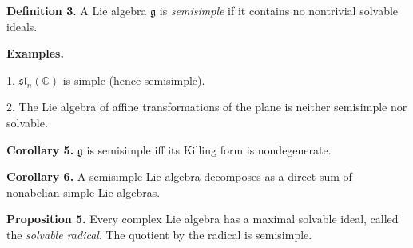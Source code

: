 \textbf{Definition 3.}
A Lie algebra $\mathfrak g$ is \emph{semisimple}
if it contains no nontrivial solvable ideals.

\textbf{Examples.}

1. $\mathfrak{sl}_n(\mathbb C)$ is simple (hence semisimple).

2. The Lie algebra of affine transformations of the plane
is neither semisimple nor solvable.

\textbf{Corollary 5.}
$\mathfrak g$ is semisimple iff its Killing form is nondegenerate.

\textbf{Corollary 6.}
A semisimple Lie algebra decomposes as a direct sum
of nonabelian simple Lie algebras.

\textbf{Proposition 5.}
Every complex Lie algebra has a maximal solvable ideal,
called the \emph{solvable radical}.
The quotient by the radical is semisimple.
